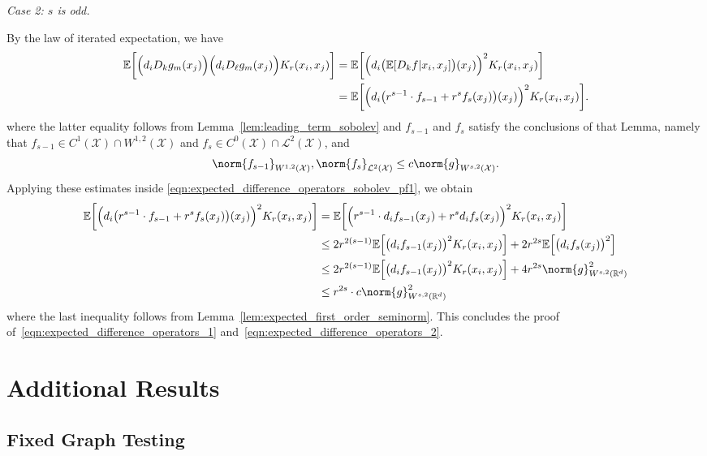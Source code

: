 \documentclass{article}
\newcommand{\Reals}{\mathbb{R}}
\newcommand{\1}{\mathbf{1}}
\newcommand{\Rd}{\Reals^d}
\newcommand{\Xset}{\mathcal{X}}
\newcommand{\Leb}{\mathcal{L}}
\newcommand{\Ebb}{\mathbb{E}}
\theoremstyle{alden}
\theoremstyle{aldenthm}
\theoremstyle{definition}
\theoremstyle{remark}
\begin{document}
\textit{Case 2: $s$ is odd.}

By the law of iterated expectation, we have
\begin{align}
\Ebb\biggl[\Bigl(d_iD_kg_m(x_j)\Bigr) \Bigl(d_iD_{\ell}g_m(x_j)\Bigr) K_r(x_i,x_j)\biggr] & = \Ebb\biggl[\Bigl(d_i\bigl(\Ebb[D_kf|x_i,x_j]\bigr)(x_j)\Bigr)^2K_r(x_i,x_j)\biggr] \nonumber \\
& = \Ebb\biggl[\Bigl(d_i\bigl(r^{s - 1}\cdot f_{s - 1} + r^sf_s(x_j)\bigr)(x_j)\Bigr)^2K_r(x_i,x_j)\biggr]. \label{eqn:expected_difference_operators_sobolev_pf1}
\end{align}
where the latter equality follows from Lemma~\ref{lem:leading_term_sobolev} and $f_{s -1}$ and $f_s$ satisfy the conclusions of that Lemma, namely that $f_{s - 1} \in C^1(\Xset) \cap W^{1,2}(\Xset)$ and $f_s \in C^{0}(\Xset) \cap \Leb^2(\Xset)$, and
\begin{equation*}
\norm{f_{s - 1}}_{W^{1,2}(\Xset)}, \norm{f_s}_{\Leb^2(\Xset)} \leq c \norm{g}_{W^{s,2}(\Xset)}.
\end{equation*}
Applying these estimates inside \eqref{eqn:expected_difference_operators_sobolev_pf1}, we obtain
\begin{align*}
\Ebb\biggl[\Bigl(d_i\bigl(r^{s - 1}\cdot f_{s - 1} + r^s f_s(x_j)\bigr)(x_j)\Bigr)^2K_r(x_i,x_j)\biggr] & = \Ebb\biggl[\Bigl(r^{s - 1} \cdot d_if_{s - 1}(x_j) + r^s d_if_s(x_j)\Bigr)^2K_r(x_i,x_j)\biggr] \\
& \leq 2r^{2(s - 1)} \Ebb\Bigl[\bigl(d_if_{s-1}(x_j)\bigr)^2K_r(x_i,x_j)\Bigr] + 2r^{2s}\Ebb\Bigl[\bigl(d_if_s(x_j)\bigr)^2\Bigr] \\
& \leq 2r^{2(s - 1)} \Ebb\Bigl[\bigl(d_if_{s-1}(x_j)\bigr)^2K_r(x_i,x_j)\Bigr] + 4r^{2s} \norm{g}_{W^{s,2}(\Rd)}^2 \\
& \leq r^{2s} \cdot c\norm{g}_{W^{s,2}(\Rd)}^2
\end{align*}
where the last inequality follows from Lemma~\ref{lem:expected_first_order_seminorm}. This concludes the proof of~\eqref{eqn:expected_difference_operators_1} and~\eqref{eqn:expected_difference_operators_2}.


\section{Additional Results}

\subsection{Fixed Graph Testing}
\end{document}
